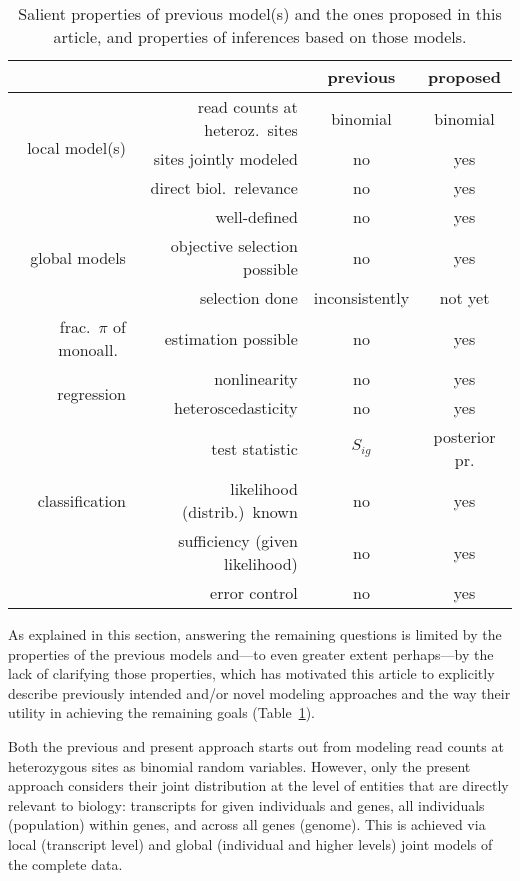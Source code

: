 \documentclass[letterpaper]{article}
\begin{document}
\begin{table}[t]
\begin{tabular}{rr|cc}
& & previous & proposed \\
\hline
\hline
\multirow{3}{*}{local model(s)} & read counts at heteroz.~sites & binomial &
binomial\\
& sites jointly modeled & no & yes \\
& direct biol.~relevance & no & yes \\
\hline
\multirow{3}{*}{global models} & well-defined & no & yes \\
& objective selection possible & no & yes \\
& selection done & inconsistently & not yet \\
\hline
\multirow{1}{*}{frac.~\(\pi\) of monoall.~} & estimation possible & no & yes \\
\hline
\multirow{2}{*}{regression} & nonlinearity & no & yes \\
& heteroscedasticity & no & yes\\
\hline
\multirow{3}{*}{classification} & test statistic & \(S_{ig}\) & posterior
pr. \\
& likelihood (distrib.)~known & no & yes \\
& sufficiency (given likelihood) & no & yes \\
& error control & no & yes \\
\hline
\end{tabular}
\caption{
Salient properties of previous model(s) and the ones proposed in this article,
and properties of inferences based on those models.
}
\label{tab:previous-proposed}
\end{table}

As explained in this section, answering the remaining questions is limited by the
properties of the previous models and---to even greater extent perhaps---by
the lack of clarifying those properties, which has motivated this article to
explicitly describe previously intended and/or novel modeling approaches and
the way their utility in achieving the remaining goals
(Table~\ref{tab:previous-proposed}).

Both the previous and present approach starts out from modeling read counts at
heterozygous sites as binomial random variables.  However, only the present
approach considers their joint distribution at the level of entities that are
directly relevant to biology: transcripts for given individuals and genes, all
individuals (population) within genes, and across all genes (genome).  This is
achieved via local (transcript level) and global (individual and higher
levels) joint models of the complete data.
\end{document}
